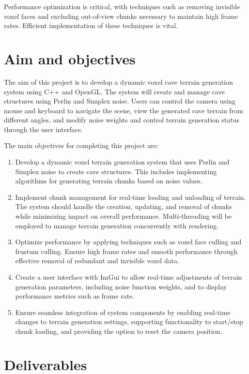 Performance optimization is critical, with techniques such as removing invisible voxel faces and excluding out-of-view chunks necessary to maintain high frame rates. Efficient implementation of these techniques is vital.

\section{Aim and objectives}

The aim of this project is to develop a dynamic voxel cave terrain generation system using C++ and OpenGL. The system will create and manage cave structures using Perlin and Simplex noise. Users can control the camera using mouse and keyboard to navigate the scene, view the generated cave terrain from different angles, and modify noise weights and control terrain generation status through the user interface.

The main objectives for completing this project are:
\begin{enumerate}
    \item Develop a dynamic voxel terrain generation system that uses Perlin and Simplex noise to create cave structures. This includes implementing algorithms for generating terrain chunks based on noise values.
    \item Implement chunk management for real-time loading and unloading of terrain. The system should handle the creation, updating, and removal of chunks while minimizing impact on overall performance. Multi-threading will be employed to manage terrain generation concurrently with rendering.
    \item Optimize performance by applying techniques such as voxel face culling and frustum culling. Ensure high frame rates and smooth performance through effective removal of redundant and invisible voxel data.
    \item Create a user interface with ImGui to allow real-time adjustments of terrain generation parameters, including noise function weights, and to display performance metrics such as frame rate.
    \item Ensure seamless integration of system components by enabling real-time changes to terrain generation settings, supporting functionality to start/stop chunk loading, and providing the option to reset the camera position.
\end{enumerate}

\section{Deliverables}

